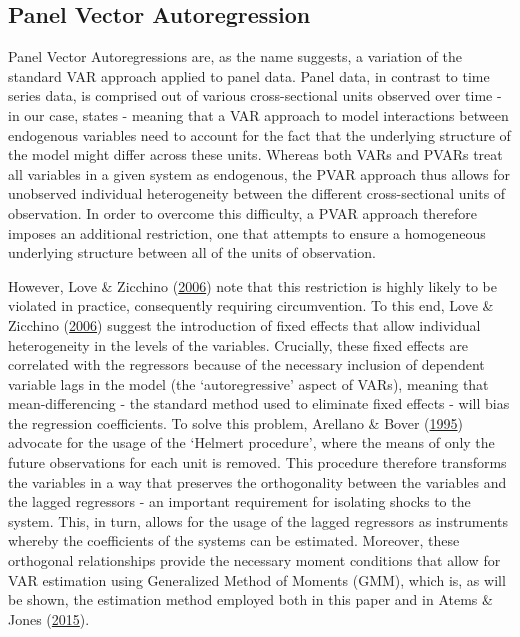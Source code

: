\documentclass[11pt,preprint, authoryear]{elsarticle}
\numberwithin{equation}{section}
\numberwithin{figure}{section}
\numberwithin{table}{section}
\begin{document}
\hypertarget{panel-vector-autoregression}{%
\subsection{\texorpdfstring{Panel Vector Autoregression
\label{Section 2.1}}{Panel Vector Autoregression }}\label{panel-vector-autoregression}}

Panel Vector Autoregressions are, as the name suggests, a variation of
the standard VAR approach applied to panel data. Panel data, in contrast
to time series data, is comprised out of various cross-sectional units
observed over time - in our case, states - meaning that a VAR approach
to model interactions between endogenous variables need to account for
the fact that the underlying structure of the model might differ across
these units. Whereas both VARs and PVARs treat all variables in a given
system as endogenous, the PVAR approach thus allows for unobserved
individual heterogeneity between the different cross-sectional units of
observation. In order to overcome this difficulty, a PVAR approach
therefore imposes an additional restriction, one that attempts to ensure
a homogeneous underlying structure between all of the units of
observation.

However, Love \& Zicchino (\protect\hyperlink{ref-love}{2006}) note that
this restriction is highly likely to be violated in practice,
consequently requiring circumvention. To this end, Love \& Zicchino
(\protect\hyperlink{ref-love}{2006}) suggest the introduction of fixed
effects that allow individual heterogeneity in the levels of the
variables. Crucially, these fixed effects are correlated with the
regressors because of the necessary inclusion of dependent variable lags
in the model (the `autoregressive' aspect of VARs), meaning that
mean-differencing - the standard method used to eliminate fixed effects
- will bias the regression coefficients. To solve this problem, Arellano
\& Bover (\protect\hyperlink{ref-arellano}{1995}) advocate for the usage
of the `Helmert procedure', where the means of only the future
observations for each unit is removed. This procedure therefore
transforms the variables in a way that preserves the orthogonality
between the variables and the lagged regressors - an important
requirement for isolating shocks to the system. This, in turn, allows
for the usage of the lagged regressors as instruments whereby the
coefficients of the systems can be estimated. Moreover, these orthogonal
relationships provide the necessary moment conditions that allow for VAR
estimation using Generalized Method of Moments (GMM), which is, as will
be shown, the estimation method employed both in this paper and in Atems
\& Jones (\protect\hyperlink{ref-atems}{2015}).
\end{document}
